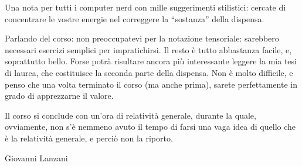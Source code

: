  Una nota per tutti i computer nerd con mille suggerimenti stilistici:
cercate di concentrare le vostre energie nel correggere la ``sostanza''
della dispensa.

Parlando del corso: non preoccupatevi per la notazione tensoriale: sarebbero
necessari esercizi semplici per impratichirsi. Il resto \`e tutto
abbastanza facile, e, soprattutto bello. Forse potr\`a risultare ancora
pi\`u interessante leggere la mia tesi di laurea, che costituisce la
seconda parte della dispensa. Non \`e molto difficile, e penso che una
volta terminato il corso (ma anche prima), sarete perfettamente in grado
di apprezzarne il valore.

Il corso si conclude con un'ora di relativit\`a generale, durante la quale,
ovviamente, non s'\`e nemmeno avuto il tempo di farsi una vaga
idea di quello che \`e la relativit\`a generale, e perci\`o non la
riporto.

 \vskip 0.2cm
 \hskip 1cm Giovanni Lanzani
